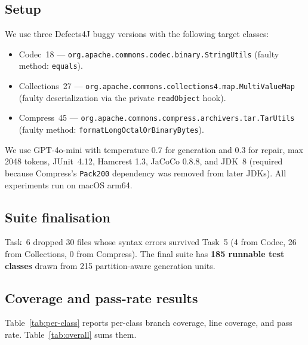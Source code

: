 \documentclass[conference]{IEEEtran}
\begin{document}
\subsection{Setup}
We use three Defects4J buggy versions with the following target
classes:
\begin{itemize}
  \item Codec~18 ---
        \texttt{org.apache.commons.codec.\linebreak binary.StringUtils}
        (faulty method: \texttt{equals}).
  \item Collections~27 ---
        \texttt{org.apache.commons.\linebreak collections4.map.MultiValueMap}
        (faulty deserialization via the private \texttt{readObject}
        hook).
  \item Compress~45 ---
        \texttt{org.apache.commons.\linebreak compress.archivers.tar.TarUtils}
        (faulty method:
        \texttt{format\-Long\-Octal\-Or\-Binary\-Bytes}).
\end{itemize}
We use GPT-4o-mini with temperature 0.7 for generation and 0.3 for
repair, max 2048 tokens, JUnit~4.12, Hamcrest 1.3, JaCoCo 0.8.8, and
JDK~8 (required because Compress's \texttt{Pack200} dependency was
removed from later JDKs). All experiments run on macOS arm64.

\subsection{Suite finalisation}
Task~6 dropped 30 files whose syntax errors survived Task~5 (4 from
Codec, 26 from Collections, 0 from Compress). The final suite has
\textbf{185 runnable test classes} drawn from 215 partition-aware
generation units.

\subsection{Coverage and pass-rate results}
Table~\ref{tab:per-class} reports per-class branch coverage, line
coverage, and pass rate. Table~\ref{tab:overall} sums them.
\end{document}
